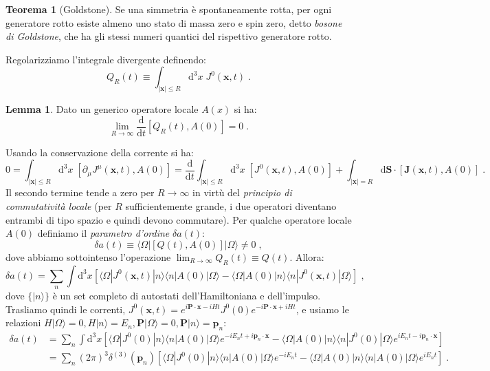 \documentclass[12pt,a4paper]{article}
\theoremstyle{definition}
\newtheorem{thm}{Teorema}
\newtheorem{lem}{Lemma}
\newcommand{\diff}[1][]{\mathrm{d}#1}
\newcommand{\bra}{\langle}
\newcommand{\ket}{\rangle}
\numberwithin{equation}{section}
\begin{document}
\begin{thm}[Goldstone] Se una simmetria è spontaneamente rotta, per ogni generatore rotto esiste almeno uno stato di massa zero e spin zero, detto \emph{bosone di Goldstone}, che ha gli stessi numeri quantici del rispettivo generatore rotto.
\end{thm}
\proof Regolarizziamo l'integrale divergente definendo:
\begin{equation}
Q_R(t)\equiv\int_{|\mathbf{x}|\le R}\diff^3{x}\; J^0(\mathbf{x},t)\;.
\end{equation}
\begin{lem} Dato un generico operatore locale $A(x)$ si ha:
\begin{equation}
\lim_{R\to\infty}\frac{\diff}{\diff{t}}[Q_R(t),A(0)]=0\;.
\end{equation}
\end{lem}
\proof Usando la conservazione della corrente si ha:
\begin{equation}
0=\int_{|\mathbf{x}|\le R}\diff^3{x}\;[\partial_{\mu}J^{\mu}(\mathbf{x},t),A(0)]=\frac{\diff}{\diff{t}}\int_{|\mathbf{x}|\le R}\diff^3{x}\;[J^0(\mathbf{x},t),A(0)]+\int_{|\mathbf{x}|=R}\diff{\mathbf{S}}\cdot [\mathbf{J}(\mathbf{x},t),A(0)]\;.
\end{equation}
Il secondo termine tende a zero per $R\to\infty$ in virtù del \emph{principio di commutatività locale} (per $R$ sufficientemente grande, i due operatori diventano entrambi di tipo spazio e quindi devono commutare).
\endproof
Per qualche operatore locale $A(0)$ definiamo il \emph{parametro d'ordine} $\delta a(t)$:
\begin{equation}
\delta a(t)\equiv \bra\Omega|[Q(t),A(0)]|\Omega\ket\ne 0\;,
\end{equation}
dove abbiamo sottointenso l'operazione $\lim_{R\to\infty}Q_R(t)\equiv Q(t)$. Allora:
$$
\delta a(t)=\sum_n\int\diff^3{x}\left[\bra\Omega|J^0(\mathbf{x},t)|n\ket\bra n|A(0)|\Omega\ket-\bra\Omega|A(0)|n\ket\bra n|J^0(\mathbf{x},t)|\Omega\ket\right]\;,
$$
dove $\{|n\ket\}$ è un set completo di autostati dell'Hamiltoniana e dell'impulso. Trasliamo quindi le correnti, $J^0(\mathbf{x},t)=e^{i\mathbf{P}\cdot\mathbf{x}-iHt}J^0(0)e^{-i\mathbf{P}\cdot\mathbf{x}+iHt}$, e usiamo le relazioni $H|\Omega\ket=0,H|n\ket=E_n,\mathbf{P}|\Omega\ket=0,\mathbf{P}|n\ket=\mathbf{p}_n$:
\begin{align*}
\delta a(t)&=\sum_n\int\diff^3{x}\left[\bra\Omega| J^0(0)|n\ket\bra n|A(0)|\Omega\ket e^{-iE_nt+i\mathbf{p}_n\cdot\mathbf{x}}-\bra\Omega|A(0)|n\ket\bra n|J^0(0)|\Omega\ket e^{iE_nt-i\mathbf{p}_n\cdot\mathbf{x}}\right] \\
&=\sum_n (2\pi)^3\delta^{(3)}(\mathbf{p}_n)\left[\bra\Omega|J^0(0)|n\ket\bra n|A(0)|\Omega\ket e^{-iE_nt}-\bra\Omega|A(0)|n\ket\bra n|A(0)|\Omega\ket e^{iE_nt}\right]\;.
\end{align*}
\end{document}

